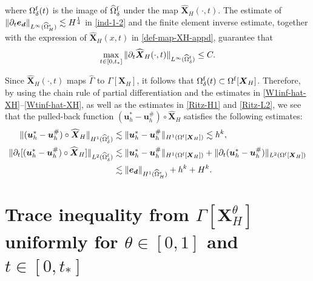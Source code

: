 \documentclass[11pt,reqno]{amsart}
\theoremstyle{definition}
\theoremstyle{plain}
\numberwithin{theorem}{section}
\numberwithin{proposition}{section}
\numberwithin{lemma}{section}
\numberwithin{equation}{section}
\newcommand{\bs}[1]{\boldsymbol{#1}}
\renewcommand{\(}{\bigl(}
\renewcommand{\)}{\bigr)}
\begin{document}
where $\Omega^{\rm f}_\delta(t)$ is the image of $\widehat{\Omega}^{\rm f}_\delta $ under the map $\widehat{\bs X}_H(\cdot,t)$. 
The estimate of $\|\partial_t{\bs e}_{\bs d}\|_{L^\infty(\widehat\Omega^{\rm s}_H)}\lesssim H^{\frac14}$ in \eqref{ind-1-2} and the finite element inverse estimate, together with the expression of $\widehat{\bs X}_H(x,t)$ in \eqref{def-map-XH-appd}, guarantee that 
\begin{align}\label{Wtinf-hat-XH}
\max_{t\in[0,t_*]}\|\partial_t\widehat{\bs X}_H(\cdot,t)\|_{L^{\infty}(\widehat{\Omega}^{\rm f}_\delta)}
\le C .
\end{align} 

Since $\widehat{\bs X}_H(\cdot,t)$ maps $\widehat\Gamma$ to $\Gamma[{\bs X}_H]$, it follows that 
$\Omega^{\rm f}_\delta(t)\subset\Omega^{\rm f}[{\bs X}_H]$. 
Therefore, by using the chain rule of partial differentiation and the estimates in \eqref{W1inf-hat-XH}--\eqref{Wtinf-hat-XH}, as well as the estimates in \eqref{Ritz-H1} and \eqref{Ritz-L2}, we see that the pulled-back function $({\bs u}_h^*-{\bs u}_h^\#)\circ\widehat{\bs X}_H$ satisfies the following estimates:
\begin{align}
\|({\bs u}_h^*-{\bs u}_h^\#)\circ\widehat{\bs X}_H\|_{H^1(\widehat{\Omega}^{\rm f}_\delta)}
&\lesssim \|{\bs u}_h^*-{\bs u}_h^\#\|_{H^1(\Omega^{\rm f}[{\bs X}_H])} 
\lesssim h^k, \\
\|\partial_t[({\bs u}_h^*-{\bs u}_h^\#)\circ\widehat{\bs X}_H]\|_{L^2(\widehat{\Omega}^{\rm f}_\delta)}
&\lesssim \|{\bs u}_h^*-{\bs u}_h^\#\|_{H^1(\Omega^{\rm f}[{\bs X}_H])}
+ \|\partial_t({\bs u}_h^*-{\bs u}_h^\#)\|_{L^2(\Omega^{\rm f}[{\bs X}_H])} \notag\\
&\lesssim \|{\bs e}_{\bs d}\|_{H^1(\widehat\Omega^{\rm s}_H)}
+ h^k + H^k .
\end{align} 


\section{Trace inequality from \texorpdfstring{$\Gamma[{\bs X}_H^\theta]$}{x} uniformly for $\theta\in[0,1]$ and $t\in[0,t_*]$}
\label{appendix:trace_inequlaity}
\end{document}
